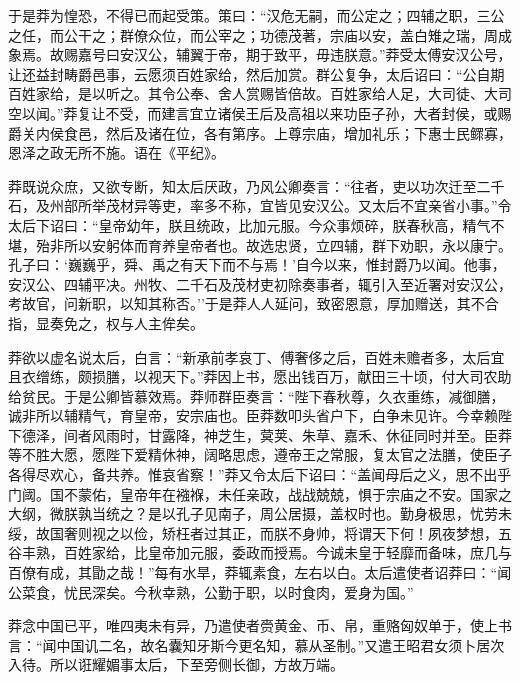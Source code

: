 \documentclass[]{article}
\begin{document}
于是莽为惶恐，不得已而起受策。策曰：``汉危无嗣，而公定之；四辅之职，三公之任，而公干之；群僚众位，而公宰之；功德茂著，宗庙以安，盖白雉之瑞，周成象焉。故赐嘉号曰安汉公，辅翼于帝，期于致平，毋违朕意。''莽受太傅安汉公号，让还益封畴爵邑事，云愿须百姓家给，然后加赏。群公复争，太后诏曰：``公自期百姓家给，是以听之。其令公奉、舍人赏赐皆倍故。百姓家给人足，大司徒、大司空以闻。''莽复让不受，而建言宜立诸侯王后及高祖以来功臣子孙，大者封侯，或赐爵关内侯食邑，然后及诸在位，各有第序。上尊宗庙，增加礼乐；下惠士民鳏寡，恩泽之政无所不施。语在《平纪》。

莽既说众庶，又欲专断，知太后厌政，乃风公卿奏言：``往者，吏以功次迁至二千石，及州部所举茂材异等吏，率多不称，宜皆见安汉公。又太后不宜亲省小事。''令太后下诏曰：``皇帝幼年，朕且统政，比加元服。今众事烦碎，朕春秋高，精气不堪，殆非所以安躬体而育养皇帝者也。故选忠贤，立四辅，群下劝职，永以康宁。孔子曰：`巍巍乎，舜、禹之有天下而不与焉！'自今以来，惟封爵乃以闻。他事，安汉公、四辅平决。州牧、二千石及茂材吏初除奏事者，辄引入至近署对安汉公，考故官，问新职，以知其称否。''于是莽人人延问，致密恩意，厚加赠送，其不合指，显奏免之，权与人主侔矣。

莽欲以虚名说太后，白言：``新承前孝哀丁、傅奢侈之后，百姓未赡者多，太后宜且衣缯练，颇损膳，以视天下。''莽因上书，愿出钱百万，献田三十顷，付大司农助给贫民。于是公卿皆慕效焉。莽师群臣奏言：``陛下春秋尊，久衣重练，减御膳，诚非所以辅精气，育皇帝，安宗庙也。臣莽数叩头省户下，白争未见许。今幸赖陛下德泽，间者风雨时，甘露降，神芝生，蓂荚、朱草、嘉禾、休征同时并至。臣莽等不胜大愿，愿陛下爱精休神，阔略思虑，遵帝王之常服，复太官之法膳，使臣子各得尽欢心，备共养。惟哀省察！''莽又令太后下诏曰：``盖闻母后之义，思不出乎门阈。国不蒙佑，皇帝年在襁褓，未任亲政，战战兢兢，惧于宗庙之不安。国家之大纲，微朕孰当统之？是以孔子见南子，周公居摄，盖权时也。勤身极思，忧劳未绥，故国奢则视之以俭，矫枉者过其正，而朕不身帅，将谓天下何！夙夜梦想，五谷丰熟，百姓家给，比皇帝加元服，委政而授焉。今诚未皇于轻靡而备味，庶几与百僚有成，其勖之哉！''每有水旱，莽辄素食，左右以白。太后遣使者诏莽曰：``闻公菜食，忧民深矣。今秋幸熟，公勤于职，以时食肉，爱身为国。''

莽念中国已平，唯四夷未有异，乃遣使者赍黄金、币、帛，重赂匈奴单于，使上书言：``闻中国讥二名，故名囊知牙斯今更名知，慕从圣制。''又遣王昭君女须卜居次入待。所以诳耀媚事太后，下至旁侧长御，方故万端。
\end{document}
